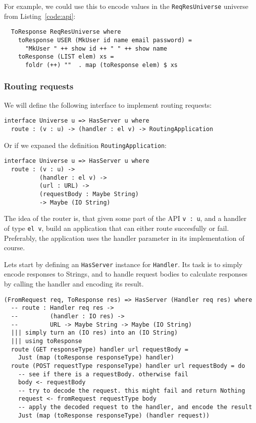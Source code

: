 \documentclass[12pt,a4paper]{article}
\begin{document}
For example, we could use this to encode values in the \texttt{ReqResUniverse} universe from
Listing~\ref{code:api}:
\begin{verbatim}
  ToResponse ReqResUniverse where
    toResponse USER (MkUser id name email password) =
      "MkUser " ++ show id ++ " " ++ show name
    toResponse (LIST elem) xs =
      foldr (++) ""  . map (toResponse elem) $ xs
\end{verbatim}

\subsubsection{Routing requests}
We will define the following interface to implement routing requests:
\begin{verbatim}
interface Universe u => HasServer u where
  route : (v : u) -> (handler : el v) -> RoutingApplication
\end{verbatim}
Or if we expaned the definition \texttt{RoutingApplication}:
\begin{verbatim}
interface Universe u => HasServer u where
  route : (v : u) ->
          (handler : el v) ->
          (url : URL) ->
          (requestBody : Maybe String)
          -> Maybe (IO String)
\end{verbatim}

The idea of the router is, that given some part of the API \texttt{v : u}, and a handler of type \texttt{el v}, build an application that can either route succesfully or fail. Preferably, the application uses the handler parameter in its implementation of course.

Lets start by defining an \texttt{HasServer} instance for \texttt{Handler}. Its task is to simply encode responses to Strings, and to handle request bodies to calculate responses
by calling the handler and encoding its result.
\begin{verbatim}
(FromRequest req, ToResponse res) => HasServer (Handler req res) where
  -- route : Handler req res -> 
  --         (handler : IO res) ->
  --         URL -> Maybe String -> Maybe (IO String)
  ||| simply turn an (IO res) into an (IO String) 
  ||| using toResponse
  route (GET responseType) handler url requestBody =
    Just (map (toResponse responseType) handler)
  route (POST requestType responseType) handler url requestBody = do
    -- see if there is a requestBody. otherwise fail
    body <- requestBody
    -- try to decode the request. this might fail and return Nothing
    request <- fromRequest requestType body
    -- apply the decoded request to the handler, and encode the result
    Just (map (toResponse responseType) (handler request))
\end{verbatim}
\end{document}
